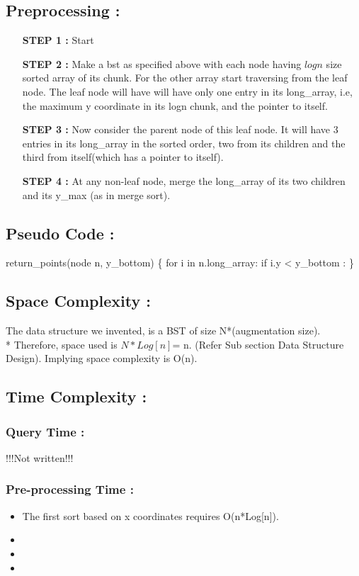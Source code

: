 \documentclass{article}
\begin{document}
\subsection{Preprocessing : }
\begin{itemize}
\item[\bf STEP 1 : ]
Start
\item[\bf STEP 2 : ]
Make a bst as specified above with each node having $logn$ size sorted array of its chunk. For the other array
start traversing from the leaf node. 
The leaf node will have will have only one entry in its long\_array, i.e, the maximum y coordinate in its logn chunk,
and the pointer to itself. 
\item[\bf STEP 3 : ]
Now consider the parent node of this leaf node. It will have 3 entries in its long\_array in the sorted order, 
two from its children and the third from itself(which has a pointer to itself). 
\item[\bf STEP 4 : ]
    At any non-leaf node, merge the long\_array of its two children and its y\_max (as in merge sort).

\end{itemize}
\subsection{Pseudo Code : }

return\_points(node n, y\_bottom)
\{
    \hspace{1cm}
    for i in n.long\_array:
        if i.y < y\_bottom :
\}
\subsection{Space Complexity : }
	The data structure we invented, is a BST of size N*(augmentation size).\\*
Therefore, space used is $N * Log[n]$= n. (Refer Sub section Data Structure Design).
Implying space complexity is O(n).
\subsection{Time Complexity : }
\subsubsection{Query Time : }
!!!Not written!!!
\subsubsection{Pre-processing Time : }
\begin{itemize}
\item The first sort based on x coordinates requires O(n*Log[n]).
\item 
\item
\item

\end{itemize}
\end{document}
